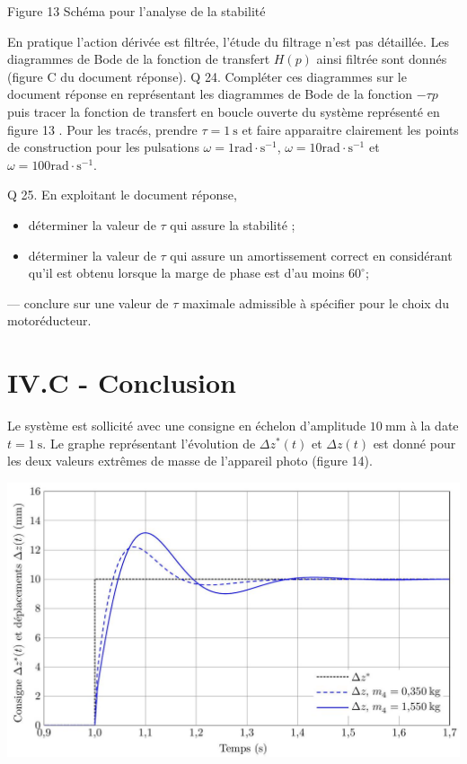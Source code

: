 \documentclass[10pt]{article}
\begin{document}
Figure 13 Schéma pour l'analyse de la stabilité

En pratique l'action dérivée est filtrée, l'étude du filtrage n'est pas détaillée. Les diagrammes de Bode de la fonction de transfert $H(p)$ ainsi filtrée sont donnés (figure $\mathrm{C}$ du document réponse). Q 24. Compléter ces diagrammes sur le document réponse en représentant les diagrammes de Bode de la fonction $-\tau p$ puis tracer la fonction de transfert en boucle ouverte du système représenté en figure 13 . Pour les tracés, prendre $\tau=1 \mathrm{~s}$ et faire apparaitre clairement les points de construction pour les pulsations $\omega=1 \mathrm{rad} \cdot \mathrm{s}^{-1}$, $\omega=10 \mathrm{rad} \cdot \mathrm{s}^{-1}$ et $\omega=100 \mathrm{rad} \cdot \mathrm{s}^{-1}$.

Q 25. En exploitant le document réponse,

\begin{itemize}
  \item déterminer la valeur de $\tau$ qui assure la stabilité ;

  \item déterminer la valeur de $\tau$ qui assure un amortissement correct en considérant qu'il est obtenu lorsque la marge de phase est d'au moins $60^{\circ}$;

\end{itemize}

— conclure sur une valeur de $\tau$ maximale admissible à spécifier pour le choix du motoréducteur.

\section{IV.C - Conclusion}
Le système est sollicité avec une consigne en échelon d'amplitude $10 \mathrm{~mm}$ à la date $t=1 \mathrm{~s}$. Le graphe représentant l'évolution de $\Delta z^{*}(t)$ et $\Delta z(t)$ est donné pour les deux valeurs extrêmes de masse de l'appareil photo (figure 14).

\begin{center}
\includegraphics[max width=\textwidth]{2022_12_31_ed674c1a831ea1bff3a0g-10}
\end{center}
\end{document}
